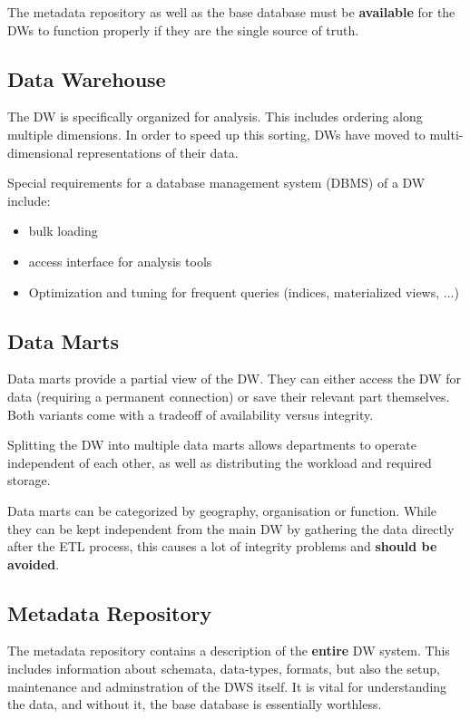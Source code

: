 \documentclass{article}
\begin{document}
The metadata repository as well as the base database must be \textbf{available} for the DWs to function properly if they are the single source of truth.

\subsection{Data Warehouse}
The DW is specifically organized for analysis.
This includes ordering along multiple dimensions.
In order to speed up this sorting, DWs have moved to multi-dimensional representations of their data.

Special requirements for a database management system (DBMS) of a DW include:
\begin{itemize}
    \item bulk loading
    \item access interface for analysis tools
    \item Optimization and tuning for frequent queries (indices, materialized views, ...)
\end{itemize}

\subsection{Data Marts}
Data marts provide a partial view of the DW.
They can either access the DW for data (requiring a permanent connection) or save their relevant part themselves.
Both variants come with a tradeoff of availability versus integrity.

Splitting the DW into multiple data marts allows departments to operate independent of each other, as well as distributing the workload and required storage.

Data marts can be categorized by geography, organisation or function.
While they can be kept independent from the main DW by gathering the data directly after the ETL process, this causes a lot of integrity problems and \textbf{should be avoided}.

\subsection{Metadata Repository}
The metadata repository contains a description of the \textbf{entire} DW system.
This includes information about schemata, data-types, formats, but also the setup, maintenance and adminstration of the DWS itself.
It is vital for understanding the data, and without it, the base database is essentially worthless.
\end{document}
